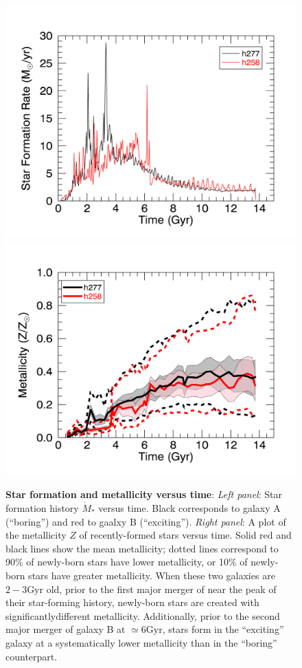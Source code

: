 \documentclass[nofootinbib,twocolumn,prd]{emulateapj}
\newcommand\unit[1]{\text{#1}}
\begin{document}
\begin{figure}
\includegraphics[width=\columnwidth]{Figures/sfh}
\includegraphics[width=\columnwidth]{Figures/zvst}
\caption{\label{fig:TwoGalaxies}\textbf{Star formation and metallicity versus time}:  \emph{Left panel}: Star formation history $\dot{M}_{*}$
  versus time.  Black corresponds to galaxy A (``boring'') and red to gaalxy B (``exciting'').  
\emph{Right panel}: A plot of the  metallicity $Z$ of recently-formed stars versus time.  Solid red and black lines show
the mean metallicity; dotted lines correspond to  90\% of newly-born stars have lower metallicity,   or 10\% of
newly-born stars have greater metallicity.  When these two galaxies are $2-3\unit{Gyr}$ old, prior to the first major
merger of  near the peak of their
star-forming history, newly-born stars are created with significantlydifferent metallicity.  Additionally, prior to the
second major merger of galaxy B at $\simeq 6\unit{Gyr}$, stars form in the ``exciting'' galaxy at a systematically lower
metallicity than in the ``boring'' counterpart.
}
\end{figure}
\end{document}
